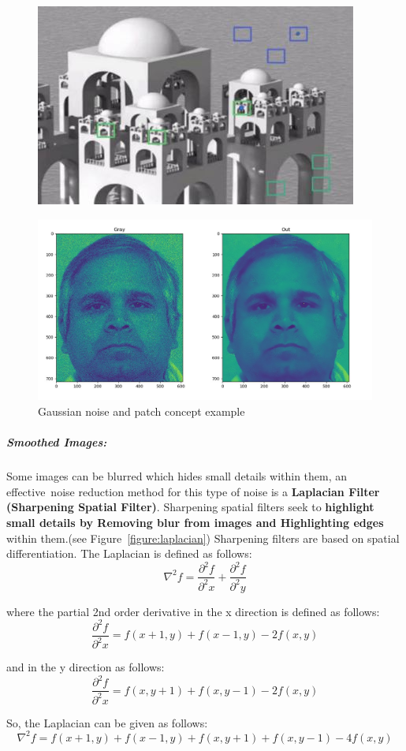 \begin{figure}[H]
	\centering
	\includegraphics[width=.5\linewidth]{images/nlmd.jpg}
\end{figure}

\begin{figure}[H]
	\centering
	\includegraphics[width=.5\linewidth]{images/gaussian.jpg}
	\caption{Gaussian noise and patch concept example}
	\label{fig:Gnoise}
\end{figure}

\subparagraph{Smoothed Images:}
Some images can be blurred which hides small details within them, an effective noise reduction method for this type of noise is a \textbf{Laplacian Filter (Sharpening Spatial Filter)}.\newline
Sharpening spatial filters seek to \textbf{highlight small details by Removing blur from images and Highlighting edges} within them.(see Figure~\ref{figure:laplacian})\newline
Sharpening filters are based on spatial differentiation.\newline
The Laplacian is defined as follows:
\[\nabla^{2} f = \frac{\partial^{2}f}{\partial^{2}x} + \frac{\partial^{2}f}{\partial^{2}y}\]

where the partial 2nd order derivative in the x direction is defined as follows:
\[\frac{\partial^{2}f}{\partial^{2}x} = f(x+1, y) + f(x-1, y) - 2f(x, y)\]

and in the y direction as follows:
\[\frac{\partial^{2}f}{\partial^{2}x} = f(x, y+1) + f(x, y-1) - 2f(x, y)\]

So, the Laplacian can be given as follows:
\[\nabla^{2} f = f(x+1, y) + f(x-1, y) + f(x, y+1) + f(x, y-1) - 4f(x, y)\]

